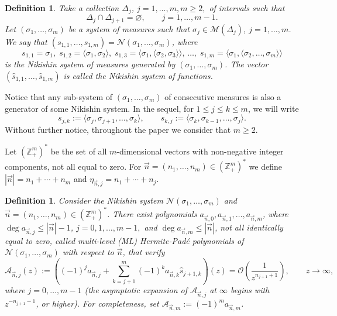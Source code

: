 \documentclass{amsart}
\numberwithin{equation}{section}
\newtheorem{definition}[theorem]{Definition}
\theoremstyle{definition}
\newcommand{\ZZ}{\mathbb{Z}}      %
\newcommand{\n}{\vec{n}}          %
\begin{document}
	\begin{definition}
		\label{df:nikishin}
		Take a collection $\Delta_j$, $j=1,\ldots,m, m \geq 2,$ of intervals such that
\begin{equation} \label{empty}  \Delta_j\cap\Delta_{j+1}=\varnothing, \qquad  j=1,\ldots,m-1.
\end{equation}
		Let $(\sigma_1,\ldots,\sigma_m)$ be a system of measures such that  $\sigma_j\in\mathcal{M}(\Delta_j)$, $j=1,\ldots,m$. We say that $(s_{1,1},\ldots,s_{1,m})=\mathcal{N}(\sigma_1,\ldots,\sigma_m)$, where
		\[  s_{1,1}=\sigma_1,\; s_{1,2}=\langle\sigma_1,\sigma_2 \rangle,\;s_{1,3}=\langle\sigma_1,\langle \sigma_2,\sigma_3\rangle \rangle,\, \ldots, \; s_{1,m}=\langle \sigma_1, \langle \sigma_2,\ldots,\sigma_m \rangle\rangle
		\]
		is the Nikishin system of measures generated by $(\sigma_1,\ldots,\sigma_m)$. The vector $(\widehat{s}_{1,1},\ldots,\widehat{s}_{1,m})$ is called the Nikishin system of functions.
	\end{definition}
	
	Notice that any sub-system of $(\sigma_1,\ldots,\sigma_m)$ of consecutive measures is also a generator of some Nikishin system. In the sequel, for $1\leq j\leq k\leq m$, we will write
	\[  s_{j,k} := \langle \sigma_j, \sigma_{j+1},\ldots, \sigma_k \rangle,\qquad s_{k,j} := \langle \sigma_k, \sigma_{k-1},\ldots, \sigma_j \rangle.
	\]
Without further notice, throughout the paper we consider that $m \geq 2$.


    Let $(\ZZ_+^m)^*$ be the set of all $m$-dimensional vectors with non-negative integer components, not all equal to zero. For $\n = (n_1,\ldots,n_{m})\in (\ZZ_+^m)^*$ we define $|\n|= n_1 + \cdots + n_{m}$ and $\eta_{\n,j} = n_1+\cdots+n_j$.
    \begin{definition}
        \label{df:HP:ly}
        Consider the Nikishin system $\mathcal{N}(\sigma_1,\ldots,\sigma_m)$ and $\n = (n_1,\ldots,n_{m}) \in (\ZZ_+^m)^*$. There exist polynomials $a_{\n,0}, a_{\n,1},\ldots,a_{\n,m}$, where $\deg a_{\n,j}\leq |\n|-1$, $j=0,1,\ldots,m-1,$ and $\deg a_{\n,m}\leq |\n|$, not all identically equal to zero, called multi-level (ML) Hermite-Padé polynomials of $\mathcal{N}(\sigma_1,\ldots,\sigma_m)$ with respect to $\n$, that verify
        \begin{equation}
            \label{df:HP:ly:1}
            \mathcal{A}_{\n,j}(z) := \left((-1)^j a_{\n,j} + \sum_{k=j+1}^m (-1)^k a_{\n,k}\widehat{s}_{j+1,k}\right)(z) = \mathcal{O}\left(\frac{1}{z^{n_{j+1}+1}}\right), \qquad z \to \infty,
        \end{equation}
        where $j=0,\ldots,m-1$ (the asymptotic expansion of $\mathcal{A}_{\n,j}$ at $\infty$ begins with $z^{-n_{j+1} -1}$, or higher). For completeness, set $\mathcal{A}_{\n,m} := (-1)^m a_{\n,m}$.
    \end{definition}
\end{document}
